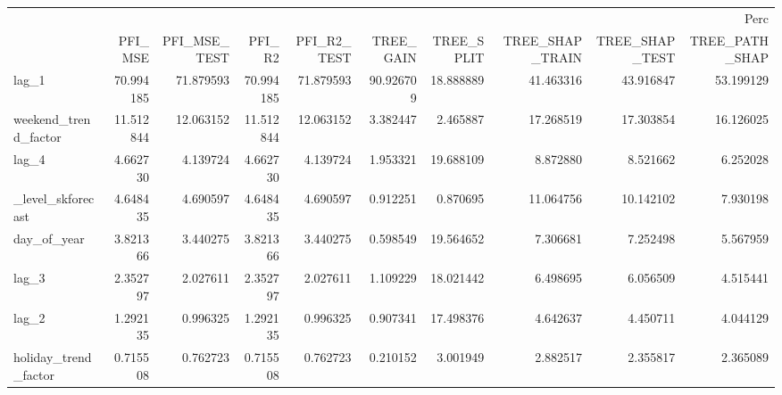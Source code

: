 \begin{tabular}{lrrrrrrrrr}
\toprule
 & \multicolumn{9}{r}{Perc} \\
 & PFI_MSE & PFI_MSE_TEST & PFI_R2 & PFI_R2_TEST & TREE_GAIN & TREE_SPLIT & TREE_SHAP_TRAIN & TREE_SHAP_TEST & TREE_PATH_SHAP \\
\midrule
lag_1 & 70.994185 & 71.879593 & 70.994185 & 71.879593 & 90.926709 & 18.888889 & 41.463316 & 43.916847 & 53.199129 \\
weekend_trend_factor & 11.512844 & 12.063152 & 11.512844 & 12.063152 & 3.382447 & 2.465887 & 17.268519 & 17.303854 & 16.126025 \\
lag_4 & 4.662730 & 4.139724 & 4.662730 & 4.139724 & 1.953321 & 19.688109 & 8.872880 & 8.521662 & 6.252028 \\
_level_skforecast & 4.648435 & 4.690597 & 4.648435 & 4.690597 & 0.912251 & 0.870695 & 11.064756 & 10.142102 & 7.930198 \\
day_of_year & 3.821366 & 3.440275 & 3.821366 & 3.440275 & 0.598549 & 19.564652 & 7.306681 & 7.252498 & 5.567959 \\
lag_3 & 2.352797 & 2.027611 & 2.352797 & 2.027611 & 1.109229 & 18.021442 & 6.498695 & 6.056509 & 4.515441 \\
lag_2 & 1.292135 & 0.996325 & 1.292135 & 0.996325 & 0.907341 & 17.498376 & 4.642637 & 4.450711 & 4.044129 \\
holiday_trend_factor & 0.715508 & 0.762723 & 0.715508 & 0.762723 & 0.210152 & 3.001949 & 2.882517 & 2.355817 & 2.365089 \\
\bottomrule
\end{tabular}
